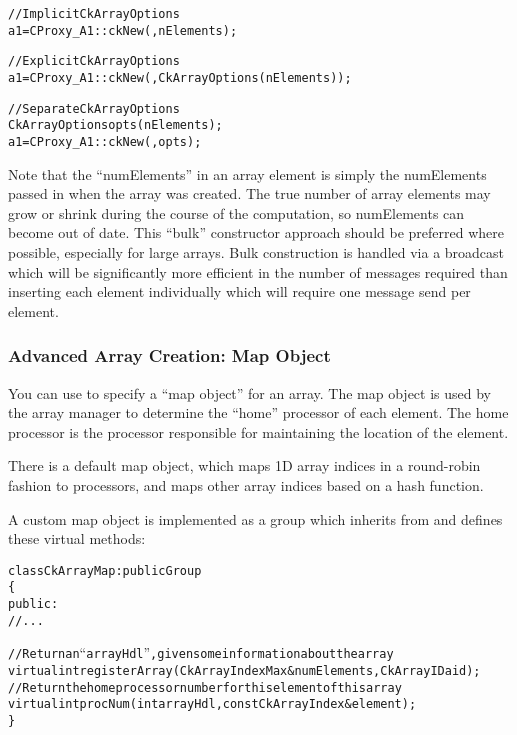\begin{alltt}
//Implicit CkArrayOptions
  a1=CProxy_A1::ckNew(,nElements);

//Explicit CkArrayOptions
  a1=CProxy_A1::ckNew(,CkArrayOptions(nElements));

//Separate CkArrayOptions
  CkArrayOptions opts(nElements);
  a1=CProxy_A1::ckNew(,opts);
\end{alltt}

Note that the ``numElements'' in an array element is simply the
numElements passed in when the array was created.  The true number of
array elements may grow or shrink during the course of the
computation, so numElements can become out of date.  This ``bulk''
constructor approach should be preferred where possible, especially
for large arrays.  Bulk construction is handled via a broadcast which
will be significantly more efficient in the number of messages
required than inserting each element individually which will require
one message send per element.

\subsubsection{Advanced Array Creation: Map Object}

\label{array map}

You can use  to specify a ``map object''
for an array.  The map object is used by the array manager
to determine the ``home'' processor of each element.  The
home processor is the processor responsible for maintaining
the location of the element.

There is a default map object, which maps 1D array indices
in a round-robin fashion to processors, and maps other array
indices based on a hash function.

A custom map object is implemented as a group which inherits from
 and defines these virtual methods:

\begin{alltt}
class CkArrayMap : public Group
\{
public:
  //...
  
  //Return an ``arrayHdl'', given some information about the array
  virtual int registerArray(CkArrayIndexMax& numElements,CkArrayID aid);
  //Return the home processor number for this element of this array
  virtual int procNum(int arrayHdl,const CkArrayIndex &element);
\}
\end{alltt}

